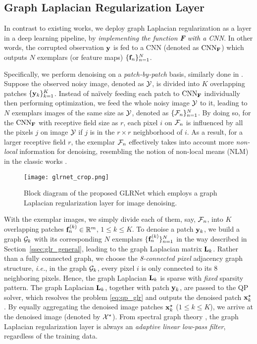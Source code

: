\documentclass[10pt,twocolumn,letterpaper]{article}
\begin{document}
\subsection{Graph Laplacian Regularization Layer}
\label{ssec:glr_layer}
In contrast to existing works, we deploy graph Laplacian regularization as a layer in a deep learning pipeline, by \emph{implementing the function {\bf F} with a CNN}. 
In other words, the corrupted observation ${\bf y}$ is fed to a CNN (denoted as $\rm{CNN}_{\bf F}$) which outputs $N$ exemplars (or feature maps) $\{{\bf f}_n\}_{n=1}^{N}$. 

Specifically, we perform denoising on a \emph{patch-by-patch} basis, similarly done in \cite{pang2017graph,hu2016graph,liu2014progressive}. 
Suppose the observed noisy image, denoted as ${\cal Y}$, is divided into $K$ overlapping patches $\{{\bf y}_k\}_{k=1}^K$.
Instead of na\"{i}vely feeding each patch to $\rm{CNN}_{\bf F}$ individually then performing optimization, we feed the whole noisy image ${\cal Y}$ to it, leading to $N$ exemplars images of the same size as ${\cal Y}$, denoted as $\{{\cal F}_n\}_{n=1}^N$. 
By doing so, for the $\rm{CNN}_{\bf F}$ with receptive field size as $r$, each pixel $i$ on ${\cal F}_n$ is influenced by all the pixels $j$ on image ${\cal Y}$ if $j$ is in the $r\times r$ neighborhood of $i$. 
As a result, for a larger receptive field $r$, the exemplar ${\cal F}_n$ effectively takes into account more \emph{non-local} information for denoising, resembling the notion of non-local means (NLM) in the classic works \cite{buades2005non,dabov2007image}. 

\begin{figure*}[t]
\centering
    \texttt{[image: glrnet\_crop.png]}
\caption{Block diagram of the proposed GLRNet which employs a graph Laplacian regularization layer for image denoising.}
\label{fig:glrnet}
\end{figure*}
With the exemplar images, we simply divide each of them, say, ${\cal F}_n$, into $K$ overlapping patches ${\bf f}_n^{(k)}\in\mathbb{R}^m$, $1\le k\le K$. 
To denoise a patch ${\bf y}_k$, we build a graph ${\cal G}_k$ with its corresponding $N$ exemplars $\{{\bf f}_n^{(k)}\}_{n=1}^N$ in the way described in Section~\ref{ssec:glr_general}, leading to the graph Laplacian matrix ${\bf L}_k$. 
Rather than a fully connected graph, we choose the \emph{8-connected pixel} adjacency graph structure, {\it i.e.}, in the graph ${\cal G}_k$, every pixel $i$ is only connected to its 8 neighboring pixels. 
Hence, the graph Laplacian ${\bf L}_k$ is sparse with \emph{fixed} sparsity pattern.
The graph Laplacian ${\bf L}_k$, together with patch ${\bf y}_k$, are passed to the QP solver, which resolves the problem \eqref{eq:qp_glr} and outputs the denoised patch ${\bf x}_k^{\star}$.
By equally aggregating the denoised image patches ${\bf x}_k^{\star}$ ($1\le k\le K$), we arrive at the denoised image (denoted by ${\cal X}^{\star}$).
From spectral graph theory \cite{chung1997spectral}, the graph Laplacian regularization layer is always an \emph{adaptive linear low-pass filter}, regardless of the training data.
\end{document}
